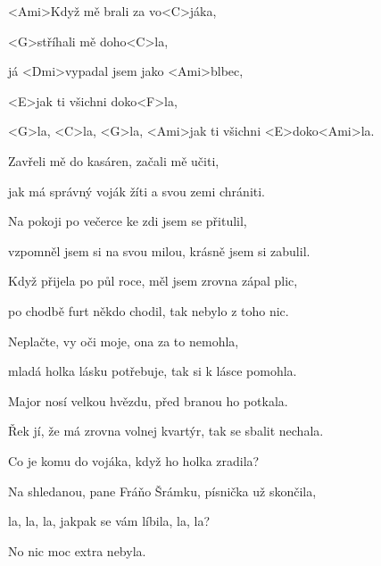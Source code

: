 

\zs
<Ami>Když mě brali za vo<C>jáka,

<G>stříhali mě doho<C>la,

já <Dmi>vypadal jsem jako <Ami>blbec,

<E>jak ti všichni doko<F>la,

<G>la, <C>la, <G>la, <Ami>jak ti všichni <E>doko<Ami>la.
\ks

\zs
Zavřeli mě do kasáren, začali mě učiti,

jak má správný voják žíti a svou zemi chrániti.
\ks

\zs
Na pokoji po večerce ke zdi jsem se přitulil,

vzpomněl jsem si na svou milou, krásně jsem si zabulil.
\ks

\zs
Když přijela po půl roce, měl jsem zrovna zápal plic,

po chodbě furt někdo chodil, tak nebylo z toho nic.
\ks

\zs
Neplačte, vy oči moje, ona za to nemohla,

mladá holka lásku potřebuje, tak si k lásce pomohla.
\ks

\zs
Major nosí velkou hvězdu, před branou ho potkala.

Řek jí, že má zrovna volnej kvartýr, tak se sbalit nechala.
\ks

\zs
Co je komu do vojáka, když ho holka zradila?

Na shledanou, pane Fráňo Šrámku, písnička už skončila,

la, la, la, jakpak se vám líbila, la, la?

No nic moc extra nebyla.
\ks

\kp
